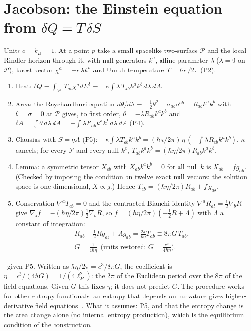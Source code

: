 \section{Jacobson: the Einstein equation from $\delta Q=T\,\delta S$}\label{app:der:jacobson}
Units $c=k_B=1$. At a point $p$ take a small spacelike two-surface $\mathcal P$ and the local Rindler horizon through it, with null generators $k^a$,
affine parameter $\lambda$ ($\lambda=0$ on $\mathcal P$), boost vector $\chi^a=-\kappa\lambda k^a$ and Unruh temperature $T=\hbar\kappa/2\pi$ (P2).
\begin{enumerate}
\item Heat: $\delta Q=\int_{\mathcal H}T_{ab}\chi^ad\Sigma^b=-\kappa\int\lambda\,T_{ab}k^ak^b\,d\lambda\,dA$.
\item Area: the Raychaudhuri equation $d\theta/d\lambda=-\tfrac12\theta^2-\sigma_{ab}\sigma^{ab}-R_{ab}k^ak^b$ with $\theta=\sigma=0$ at $\mathcal P$
gives, to first order, $\theta=-\lambda R_{ab}k^ak^b$ and $\delta A=\int\theta\,d\lambda\,dA=-\int\lambda R_{ab}k^ak^b\,d\lambda\,dA$ (P4).
\item Clausius with $S=\eta A$ (P5): $-\kappa\int\lambda T_{ab}k^ak^b=(\hbar\kappa/2\pi)\,\eta\,(-\int\lambda R_{ab}k^ak^b)$. $\kappa$ cancels; for every
$\mathcal P$ and every null $k^a$, $T_{ab}k^ak^b=(\hbar\eta/2\pi)R_{ab}k^ak^b$.
\item Lemma: a symmetric tensor $X_{ab}$ with $X_{ab}k^ak^b=0$ for all null $k$ is $X_{ab}=fg_{ab}$. (Checked by imposing the condition on twelve
exact null vectors: the solution space is one-dimensional, $X\propto g$.) Hence $T_{ab}=(\hbar\eta/2\pi)R_{ab}+f\,g_{ab}$.
\item Conservation $\nabla^aT_{ab}=0$ and the contracted Bianchi identity $\nabla^aR_{ab}=\tfrac12\nabla_bR$ give $\nabla_bf=-(\hbar\eta/2\pi)\tfrac12\nabla_bR$,
so $f=(\hbar\eta/2\pi)(-\tfrac12R+\Lambda)$ with $\Lambda$ a constant of integration:
\begin{equation}
\begin{gathered}R_{ab}-\tfrac12Rg_{ab}+\Lambda g_{ab}=\frac{2\pi}{\hbar\eta}T_{ab}\equiv8\pi G\,T_{ab},\\G=\frac{1}{4\hbar\eta}\ \ \Big(\text{units restored: }G=\frac{c^3}{4\hbar\eta}\Big).\end{gathered}
\end{equation}
\end{enumerate}
\derived\ given P5. Written as $\hbar\eta/2\pi=c^3/8\pi G$, the coefficient is $\eta=c^3/(4\hbar G)=1/(4\ell_P^2)$: the $2\pi$ of the Euclidean period over the
$8\pi$ of the field equations. Given $G$ this fixes $\eta$; it does not predict $G$. The procedure works for other entropy functionals: an entropy that
depends on curvature gives higher-derivative field equations~\cite{Jacobson1995,Wald1993}. What it assumes: P5, and that the entropy change is the area
change alone (no internal entropy production), which is the equilibrium condition of the construction.

